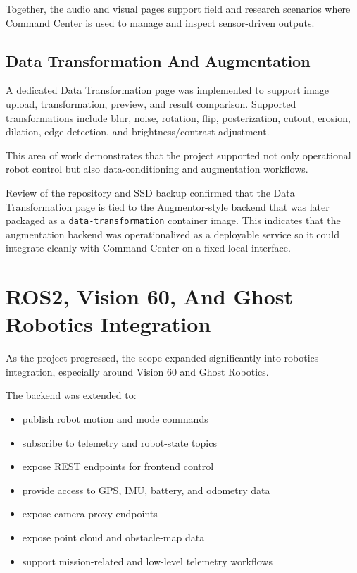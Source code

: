 \documentclass[11pt]{article}
\begin{document}
Together, the audio and visual pages support field and research scenarios where Command Center is used to manage and inspect sensor-driven outputs.

\subsection{Data Transformation And Augmentation}

A dedicated Data Transformation page was implemented to support image upload, transformation, preview, and result comparison. Supported transformations include blur, noise, rotation, flip, posterization, cutout, erosion, dilation, edge detection, and brightness/contrast adjustment.

This area of work demonstrates that the project supported not only operational robot control but also data-conditioning and augmentation workflows.

Review of the repository and SSD backup confirmed that the Data Transformation page is tied to the Augmentor-style backend that was later packaged as a \texttt{data-transformation} container image. This indicates that the augmentation backend was operationalized as a deployable service so it could integrate cleanly with Command Center on a fixed local interface.

\section{ROS2, Vision 60, And Ghost Robotics Integration}

As the project progressed, the scope expanded significantly into robotics integration, especially around Vision 60 and Ghost Robotics.

The backend was extended to:

\begin{itemize}
  \item publish robot motion and mode commands
  \item subscribe to telemetry and robot-state topics
  \item expose REST endpoints for frontend control
  \item provide access to GPS, IMU, battery, and odometry data
  \item expose camera proxy endpoints
  \item expose point cloud and obstacle-map data
  \item support mission-related and low-level telemetry workflows
\end{itemize}
\end{document}
